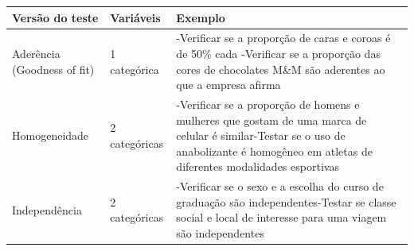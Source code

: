 \documentclass[
]{book}
\begin{document}
\begin{longtable}[]{@{}lll@{}}
\toprule
\begin{minipage}[b]{0.30\columnwidth}\raggedright
Versão do teste\strut
\end{minipage} & \begin{minipage}[b]{0.30\columnwidth}\raggedright
Variáveis\strut
\end{minipage} & \begin{minipage}[b]{0.30\columnwidth}\raggedright
Exemplo\strut
\end{minipage}\tabularnewline
\midrule
\endhead
\begin{minipage}[t]{0.30\columnwidth}\raggedright
Aderência (Goodness of fit)\strut
\end{minipage} & \begin{minipage}[t]{0.30\columnwidth}\raggedright
1 categórica\strut
\end{minipage} & \begin{minipage}[t]{0.30\columnwidth}\raggedright
-Verificar se a proporção de caras e coroas é de 50\% cada -Verificar se a proporção das cores de chocolates M\&M são aderentes ao que a empresa afirma\strut
\end{minipage}\tabularnewline
\begin{minipage}[t]{0.30\columnwidth}\raggedright
Homogeneidade\strut
\end{minipage} & \begin{minipage}[t]{0.30\columnwidth}\raggedright
2 categóricas\strut
\end{minipage} & \begin{minipage}[t]{0.30\columnwidth}\raggedright
-Verificar se a proporção de homens e mulheres que gostam de uma marca de celular é similar-Testar se o uso de anabolizante é homogêneo em atletas de diferentes modalidades esportivas\strut
\end{minipage}\tabularnewline
\begin{minipage}[t]{0.30\columnwidth}\raggedright
Independência\strut
\end{minipage} & \begin{minipage}[t]{0.30\columnwidth}\raggedright
2 categóricas\strut
\end{minipage} & \begin{minipage}[t]{0.30\columnwidth}\raggedright
-Verificar se o sexo e a escolha do curso de graduação são independentes-Testar se classe social e local de interesse para uma viagem são independentes\strut
\end{minipage}\tabularnewline
\bottomrule
\end{longtable}
\end{document}
